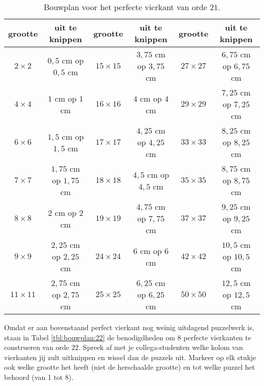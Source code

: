 \documentclass[10pt]{article}
\begin{document}
\begin{table}[ht]
  \centering
  \begin{tabular}{c|c||c|c||c|c}
    grootte & uit te knippen & grootte & uit te knippen & grootte & uit te knippen\\
    \hline
    $2\times 2$ & $0,5$ cm op $0,5$ cm & $15\times 15$ & $3,75$ cm op $3,75$ cm & $27\times 27$ & $6,75$ cm op $6,75$ cm\\
    $4\times 4$ & $1$ cm op $1$ cm & $16\times 16$ & $4$ cm op $4$ cm & $29\times 29$ & $7,25$ cm op $7,25$ cm\\
    $6\times 6$ & $1,5$ cm op $1,5$ cm & $17\times 17$ & $4,25$ cm op $4,25$ cm & $33\times 33$ & $8,25$ cm op $8,25$ cm\\
    $7\times 7$ & $1,75$ cm op $1,75$ cm & $18\times 18$ & $4,5$ cm op $4,5$ cm & $35\times 35$ & $8,75$ cm op $8,75$ cm\\
    $8\times 8$ & $2$ cm op $2$ cm & $19\times 19$ & $4,75$ cm op $7,75$ cm & $37\times 37$ & $9,25$ cm op $9,25$ cm\\
    $9\times 9$ & $2,25$ cm op $2,25$ cm & $24\times 24$ & $6$ cm op $6$ cm & $42\times 42$ & $10,5$ cm op $10,5$ cm\\
    $11\times 11$ & $2,75$ cm op $2,75$ cm & $25\times 25$ & $6,25$ cm op $6,25$ cm & $50\times 50$ & $12,5$ cm op $12,5$ cm\\
  \end{tabular}
  \caption{Bouwplan voor het perfecte vierkant van orde $21$.}
  \label{tbl:bouwplan:21}
\end{table}

Omdat er aan bovenstaand perfect vierkant nog weinig uitdagend puzzelwerk is, staan in Tabel \ref{tbl:bouwplan:22} de benodigdheden om $8$ perfecte vierkanten te construeren van orde $22$. Spreek af met je collega-studenten welke kolom van vierkanten jij zult uitknippen en wissel dan de puzzels uit. Markeer op elk stukje ook welke grootte het heeft (niet de herschaalde grootte) en tot welke puzzel het behoord (van 1 tot 8).
\end{document}
